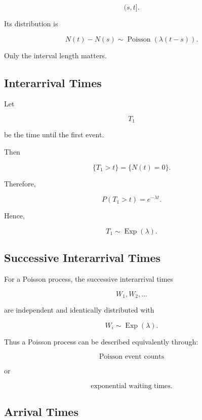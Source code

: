 \[
(s,t].
\]

Its distribution is

\[
\boxed{
N(t)-N(s)
\sim
\operatorname{Poisson}
(
\lambda(t-s)
).
}
\]

Only the interval length matters.

\subsection{Interarrival Times}
\label{subsec:poisson-interarrival-times}

Let

\[
T_1
\]

be the time until the first event.

Then

\[
\{T_1>t\}
=
\{N(t)=0\}.
\]

Therefore,

\[
P(T_1>t)
=
e^{-\lambda t}.
\]

Hence,

\[
\boxed{
T_1
\sim
\operatorname{Exp}(\lambda).
}
\]

\subsection{Successive Interarrival Times}
\label{subsec:successive-interarrival-times}

For a Poisson process, the successive interarrival times

\[
W_1,W_2,\ldots
\]

are independent and identically distributed with

\[
\boxed{
W_i
\sim
\operatorname{Exp}(\lambda).
}
\]

Thus a Poisson process can be described equivalently through:

\[
\boxed{
\text{Poisson event counts}
}
\]

or

\[
\boxed{
\text{exponential waiting times}.
}
\]

\subsection{Arrival Times}
\label{subsec:poisson-arrival-times}


